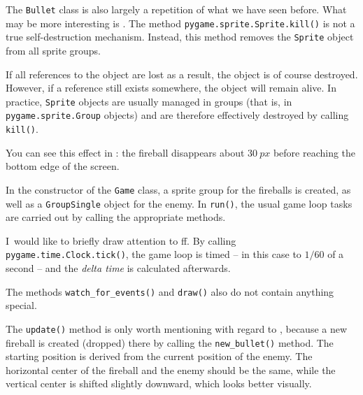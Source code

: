 
The \texttt{Bullet} class is also largely a repetition of what we have seen before. What may be more interesting is . The method \texttt{pygame.sprite.Sprite.kill()} is not a true self-destruction mechanism. Instead, this method removes the \texttt{Sprite} object from all sprite groups. 

If all references to the object are lost as a result, the object is of course destroyed. However, if a reference still exists somewhere, the object will remain alive. In practice, \texttt{Sprite} objects are usually managed in groups (that is, in \texttt{pygame.sprite.Group} objects) and are therefore effectively destroyed by calling \texttt{kill()}.  

You can see this effect in : the fireball disappears about $30~px$ before reaching the bottom edge of the screen.

\newpage
{} 

In the constructor of the \texttt{Game} class, a sprite group for the fireballs is created, as well as a \texttt{GroupSingle} object for the enemy.  In \texttt{run()}, the usual game loop tasks are carried out by calling the appropriate methods.  

I~would like to briefly draw attention to ff. By calling \texttt{pygame.time.Clock.tick()}, the game loop is timed -- in this case to $1/60$ of a second -- and the \emph{delta time} is calculated afterwards.


The methods \texttt{watch\_for\_events()} and \texttt{draw()} also do not contain anything special.


The \texttt{update()} method is only worth mentioning with regard to , because a new fireball is created (dropped) there by calling the \texttt{new\_bullet()} method. The starting position is derived from the current position of the enemy. The horizontal center of the fireball and the enemy should be the same, while the vertical center is shifted slightly downward, which looks better visually.

